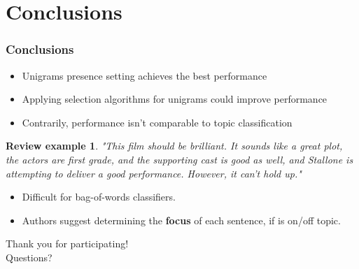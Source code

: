 \documentclass{beamer}
\newtheorem{snt}{Review example}
\begin{document}
\section{Conclusions}
\begin{frame}
	\frametitle{Conclusions}
	\begin{itemize}
	\item Unigrams presence setting achieves the best performance \pause
	\item Applying selection algorithms for unigrams could improve performance \pause
	\item Contrarily, performance isn't comparable to topic classification 
	\end{itemize}
	\pause

	\begin{snt}
		"This film should be brilliant. It sounds like a great plot, the actors are first grade, and the supporting cast is good as well, and Stallone is attempting to deliver a good performance. However, it can't hold up."
	\end{snt}
	\pause
	
	\begin{itemize}
		\item Difficult for bag-of-words classifiers. \pause
		\item Authors suggest determining the \textbf{focus} of each sentence, if is on/off topic.
	\end{itemize}
\end{frame}

\begin{frame}
	\centering
	\huge
	Thank you for participating! \\
	Questions?
\end{frame}
\end{document}
